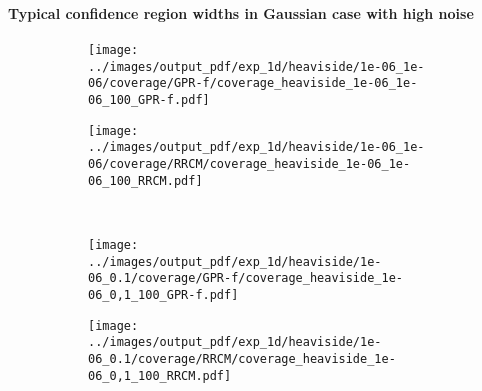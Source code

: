 \documentclass[t]{beamer}  %
\begin{document}
\begin{frame}[t]\frametitle{\insertsection}
  \framesubtitle{Typical confidence region widths in Gaussian case with high noise}
  \begin{figure}%
    \centering
    \begin{subfigure}[b]{0.45\linewidth}
      \texttt{[image: ../images/output\_pdf/exp\_1d/heaviside/1e-06\_1e-06/coverage/GPR-f/coverage\_heaviside\_1e-06\_1e-06\_100\_GPR-f.pdf]}
    \end{subfigure}%
    \begin{subfigure}[b]{0.45\linewidth}
      \texttt{[image: ../images/output\_pdf/exp\_1d/heaviside/1e-06\_1e-06/coverage/RRCM/coverage\_heaviside\_1e-06\_1e-06\_100\_RRCM.pdf]}
    \end{subfigure}\\
    \begin{subfigure}[b]{0.45\linewidth}
      \texttt{[image: ../images/output\_pdf/exp\_1d/heaviside/1e-06\_0.1/coverage/GPR-f/coverage\_heaviside\_1e-06\_0,1\_100\_GPR-f.pdf]}
    \end{subfigure}%
    \begin{subfigure}[b]{0.45\linewidth}
      \texttt{[image: ../images/output\_pdf/exp\_1d/heaviside/1e-06\_0.1/coverage/RRCM/coverage\_heaviside\_1e-06\_0,1\_100\_RRCM.pdf]}
    \end{subfigure}\\
    \label{fig:heaviside_1d_low_noise}
  \end{figure}
\end{frame}
\end{document}
